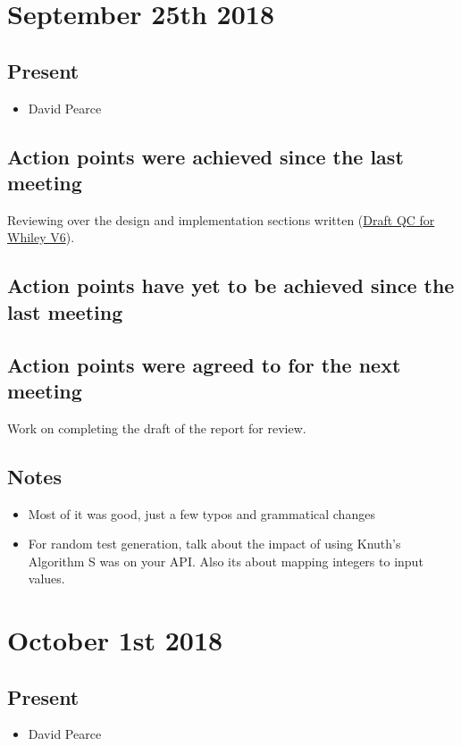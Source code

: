\documentclass[]{article}
\begin{document}
\section{September 25th 2018}
\subsection{Present}
\begin{itemize}
	\item David Pearce
\end{itemize}

\subsection{Action points were achieved since the last meeting}
Reviewing over the design and implementation sections written (\href{https://gitlab.ecs.vuw.ac.nz/project489-2018/chinjani/quickcheck-for-whiley-final-report/blob/master/Draft%20V6%20QuickCheck%20for%20Whiley%20-%20Janice%20Chin.pdf}{Draft QC for Whiley V6}). 
\subsection{Action points have yet to be achieved since the last meeting}
\subsection{Action points were agreed to for the next meeting}
Work on completing the draft of the report for review.

\subsection{Notes}
\begin{itemize}
	\item Most of it was good, just a few typos and grammatical changes
	\item For random test generation, talk about the impact of using Knuth's Algorithm S was on your API. Also its about mapping integers to input values.
\end{itemize}

\section{October 1st 2018}
\subsection{Present}
\begin{itemize}
	\item David Pearce
\end{itemize}
\end{document}

